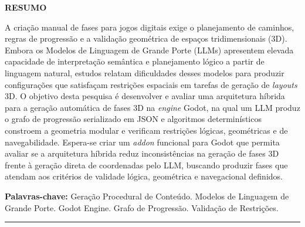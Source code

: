 \documentclass[
  12pt,
  a4paper,
  oneside,
  article,
  brazil
]{abntex2}
\begin{document}
{\centering\textbf{RESUMO}\par}
\vspace{0.1cm}
\begin{SingleSpace}
\noindent
A criação manual de fases para jogos digitais exige o planejamento de caminhos, regras de progressão e a validação geométrica de espaços tridimensionais (3D). Embora os Modelos de Linguagem de Grande Porte (LLMs) apresentem elevada capacidade de interpretação semântica e planejamento lógico a partir de linguagem natural, estudos relatam dificuldades desses modelos para produzir configurações que satisfaçam restrições espaciais em tarefas de geração de \textit{layouts} 3D. O objetivo desta pesquisa é desenvolver e avaliar uma arquitetura híbrida para a geração automática de fases 3D na \textit{engine} Godot, na qual um LLM produz o grafo de progressão serializado em JSON e algoritmos determinísticos constroem a geometria modular e verificam restrições lógicas, geométricas e de navegabilidade. Espera-se criar um \textit{addon} funcional para Godot que permita avaliar se a arquitetura híbrida reduz inconsistências na geração de fases 3D frente à geração direta de coordenadas pelo LLM, buscando produzir fases que atendam aos critérios de validade lógica, geométrica e navegacional definidos.

\vspace{0.05cm}
\noindent\textbf{Palavras-chave:} Geração Procedural de Conteúdo. Modelos de Linguagem de Grande Porte. Godot Engine. Grafo de Progressão. Validação de Restrições.
\end{SingleSpace}

\vspace{0.05cm}
\noindent\rule{\linewidth}{0.4pt}
\vspace{0.05cm}
\end{document}
